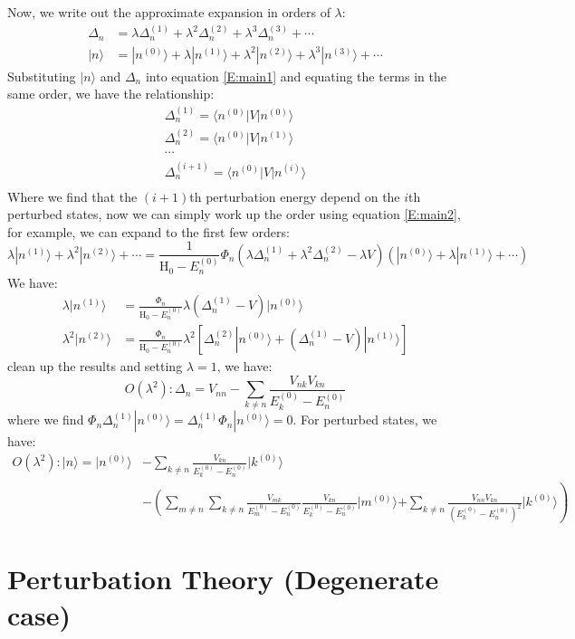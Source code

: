 \documentclass{article}
\newcommand{\huptb}{\text{H}_0}
\newcommand{\order}[2]{#1^{(#2)}}
\newcommand{\statebra}[1]{\langle #1 |}
\newcommand{\stateket}[1]{| #1 \rangle}
\begin{document}
Now, we write out the approximate expansion in orders of $\lambda$:
\begin{align}
    \Delta_n &= \lambda \order{\Delta_n}{1} + \lambda^2 \order{\Delta_n}{2} + \lambda^3 \order{\Delta_n}{3} + \cdots \\
    \stateket{n} &= \stateket{\order{n}{0}} + \lambda \stateket{\order{n}{1}} + 
                    \lambda^2 \stateket{\order{n}{2}} + \lambda^3 \stateket{\order{n}{3}} + \cdots
\end{align}
Substituting $\stateket{n}$ and $\Delta_n$ into equation \eqref{E:main1} and equating the terms in the same order,
we have the relationship:
\begin{gather}
    \order{\Delta_n}{1} = \statebra{\order{n}{0}} V \stateket{\order{n}{0}} \\
    \order{\Delta_n}{2} = \statebra{\order{n}{0}} V \stateket{\order{n}{1}} \\
    \cdots \\
    \order{\Delta_n}{i+1} = \statebra{\order{n}{0}} V \stateket{\order{n}{i}} \\
\end{gather}
Where we find that the $(i+1)$th perturbation energy depend on the $i$th perturbed states, 
now we can simply work up the order using equation \eqref{E:main2}, for example, we can expand to 
the first few orders:
\begin{equation}
    \lambda \stateket{\order{n}{1}} + \lambda^2 \stateket{\order{n}{2}} + \cdots 
    = \frac{1}{\huptb - \order{E_n}{0}} \Phi_n (\lambda \order{\Delta_n}{1} + \lambda^2 \order{\Delta_n}{2} - \lambda V) 
    \left( 
        \stateket{\order{n}{0}} + \lambda \stateket{\order{n}{1}} + \cdots
    \right)
\end{equation}
We have:
\begin{align}
    \lambda \stateket{\order{n}{1}} &= \frac{\Phi_n}{\huptb - \order{E_n}{0}} \lambda (\order{\Delta_n}{1} - V) \stateket{\order{n}{0}} \\ 
    \lambda^2 \stateket{\order{n}{2}} &= 
    \frac{\Phi_n}{\huptb - \order{E_n}{0}} \lambda^2 
        \left[ \order{\Delta_n}{2} \stateket{\order{n}{0}} +  (\order{\Delta_n}{1} - V) \stateket{\order{n}{1}}  \right]
\end{align}
clean up the results and setting $\lambda = 1$, we have:
\begin{equation}
    O(\lambda^2): \Delta_n = V_{nn} - \sum_{k\neq n}\frac{V_{nk}V_{kn}}{\order{E_k}{0} - \order{E_n}{0}}
\end{equation}
where we find $\Phi_n \order{\Delta_n}{1} \stateket{\order{n}{0}} = \order{\Delta_n}{1} \Phi_n \stateket{\order{n}{0}} = 0$. 
For perturbed states, we have:
\begin{align}
    O(\lambda^2): \stateket{n} = \stateket{\order{n}{0}} &- \sum_{k\neq n} \frac{V_{kn}}{\order{E_k}{0} - \order{E_n}{0}} \stateket{\order{k}{0}} \\ 
    & - \left( \sum_{m\neq n}\sum_{k\neq n} \frac{V_{mk}}{\order{E_m}{0} - \order{E_n}{0}} \frac{V_{kn}}{\order{E_k}{0} - \order{E_n}{0}} \stateket{\order{m}{0}} \right.
    \left. + \sum_{k\neq n} \frac{V_{nn}V_{kn}}{(\order{E_k}{0} - \order{E_n}{0})^2} \stateket{\order{k}{0}} \right)
\end{align}


\section{Perturbation Theory (Degenerate case)}
\end{document}
